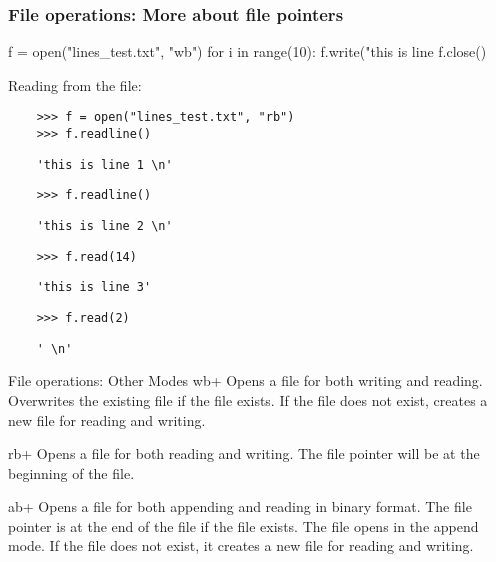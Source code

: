 \documentclass[xcolor=table,10pt,handout]{beamer}
\let\svpar\par
\let\svitemize\itemize
\let\svenditemize\enditemize
\let\svitem\item
\def\newpar{\def\par{\svpar\vfill}}
\def\newitem{\def\item{\vfill\svitem}}
\let\svcenter\center
\let\svendcenter\endcenter
\let\svcolumn\column
\let\svendcolumn\endcolumn
\newlength\columnskip
\def\newcolumn{%
  \renewenvironment{column}[2]%
    {\svcolumn{##1}\setlength{\parskip}{\columnskip}##2}%
    {\svendcolumn\vspace{\columnskip}}}
\newcommand\stretchy{\only<2>{%
  \newpar\def\item{\svitem\newitem}%
  \renewenvironment{itemize}{\svitemize}{\svenditemize\newpar\par}%
  \renewenvironment{center}{\svcenter\newpar}{\svendcenter\newpar}%
  \newcolumn
}}
\begin{document}
\begin{frame}[fragile]

  \frametitle{File operations: More about file pointers}

  \begin{mlinepython}
    f = open("lines_test.txt", "wb")
    for i in range(10):
        f.write("this is line %
    f.close()
  \end{mlinepython}
  \pause
  \bigskip

  Reading from the file:
  \smallskip

  \begin{verbatim}
    >>> f = open("lines_test.txt", "rb")
    >>> f.readline()
  \end{verbatim}
  \pause
  \vspace{-0.299cm}
  \begin{verbatim}
    'this is line 1 \n'
  \end{verbatim}
  \pause
  \vspace{-0.299cm}
  \begin{verbatim}
    >>> f.readline()
  \end{verbatim}
  \pause
  \vspace{-0.299cm}
  \begin{verbatim}
    'this is line 2 \n'
  \end{verbatim}
  \pause
  \vspace{-0.299cm}
  \begin{verbatim}
    >>> f.read(14)
  \end{verbatim}
  \pause
  \vspace{-0.299cm}
  \begin{verbatim}
    'this is line 3'
  \end{verbatim}
  \pause
  \vspace{-0.299cm}
  \begin{verbatim}
    >>> f.read(2)
  \end{verbatim}
  \pause
  \vspace{-0.299cm}
  \begin{verbatim}
    ' \n'
  \end{verbatim}

\end{frame}
%

\begin{frame}[fragile]{File operations: Other Modes}
  \stretchy
  wb+ Opens a file for both writing and reading. Overwrites the
  existing file if the file exists. If the file does not exist, creates
  a new file for reading and writing.

  rb+ Opens a file for both reading and writing. The file pointer will
  be at the beginning of the file.

  ab+ Opens a file for both appending and reading in binary
  format. The file pointer is at the end of the file if the file
  exists. The file opens in the append mode. If the file does not exist,
  it creates a new file for reading and writing.
\end{frame}
\end{document}
